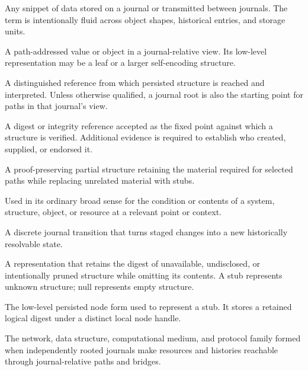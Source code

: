 \begin{description}[style=nextline]
  \item[Record]
    Any snippet of data stored on a journal or transmitted between journals. The term is intentionally fluid across object shapes, historical entries, and storage units.

  \item[Resource]
    A path-addressed value or object in a journal-relative view. Its low-level representation may be a leaf or a larger self-encoding structure.

  \item[Root]
    A distinguished reference from which persisted structure is reached and interpreted. Unless otherwise qualified, a journal root is also the starting point for paths in that journal's view.

  \item[Root commitment]
    A digest or integrity reference accepted as the fixed point against which a structure is verified. Additional evidence is required to establish who created, supplied, or endorsed it.

  \item[Slice]
    A proof-preserving partial structure retaining the material required for selected paths while replacing unrelated material with stubs.

  \item[State]
    Used in its ordinary broad sense for the condition or contents of a system, structure, object, or resource at a relevant point or context.

  \item[Step]
    A discrete journal transition that turns staged changes into a new historically resolvable state.

  \item[Stub]
    A representation that retains the digest of unavailable, undisclosed, or intentionally pruned structure while omitting its contents. A stub represents unknown structure; null represents empty structure.

  \item[Stump]
    The low-level persisted node form used to represent a stub. It stores a retained logical digest under a distinct local node handle.

  \item[Synchronic Web]
    The network, data structure, computational medium, and protocol family formed when independently rooted journals make resources and histories reachable through journal-relative paths and bridges.


\end{description}
